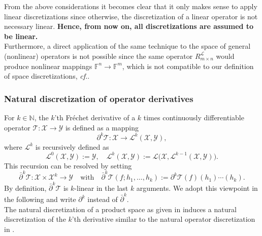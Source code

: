 \documentclass[a4paper]{paper}
\newcommand{\Spc}[1]{\mathscr{#1}}
\newcommand{\Field}{\mathbb{F}}
\newcommand{\Natural}{\mathbb{N}}
\newcommand{\Op}[1]{\mathcal{#1}}
\newcommand*{\REST}[2]{\ensuremath{R_{#1}^{#2}}}
\newcommand{\cf}{\textsl{cf.}\xspace}
\begin{document}
\begin{remark}
 From the above considerations it becomes clear that it only makes sense to apply linear discretizations since 
 otherwise, the discretization of a linear operator is not necessary linear. \textbf{Hence, from now on, all 
 discretizations are assumed to be linear.}\\
 Furthermore, a direct application of the same technique to the space of general (nonlinear) operators is not possible 
 since the same operator $\REST{m\times n}{\Spc{L}}$ would produce nonlinear mappings $\Field^n \to \Field^m$, which is 
 not compatible to our definition of space discretizations, \cf {}.
\end{remark}


\subsubsection{Natural discretization of operator derivatives}
\label{subsubsec:discr:operator:op_deriv}

For $k \in \Natural$, the $k$'th Fr\'{e}chet derivative of a $k$ times continuously differentiable operator 
$\Op{T} \colon \Spc{X} \to \Spc{Y}$ is defined as a mapping
%
\begin{equation*}
 \partial^k \Op{T} \colon \Spc{X} \to \Spc{L}^k(\Spc{X}, \Spc{Y}),
\end{equation*}
%
where $\Spc{L}^k$ is recursively defined as 
%
\begin{equation*}
 \Spc{L}^0(\Spc{X}, \Spc{Y}) := \Spc{Y}, \quad 
 \Spc{L}^k(\Spc{X}, \Spc{Y}) := \Spc{L}\big( \Spc{X}, \Spc{L}^{k-1}(\Spc{X}, \Spc{Y}) \big).
\end{equation*}
%
This recursion can be resolved by setting
%
\begin{equation*}
 \bar\partial^k \Op{T} \colon \Spc{X} \times \Spc{X}^k \to \Spc{Y}
 \quad \text{with} \quad
 \bar\partial^k \Op{T}(f; h_1, \ldots, h_k) := \partial^k\Op{T}(f)(h_1)\cdots(h_k).
\end{equation*}
%
By definition, $\bar\partial^k\Op{T}$ is $k$-linear in the last $k$ arguments. We adopt this viewpoint in the following 
and write $\partial^k$ instead of $\bar\partial^k$.\\
%
The natural discretization of a product space as given in  induces a 
natural discretization of the $k$'th derivative similar to the natural operator discretization in 
.
\end{document}
